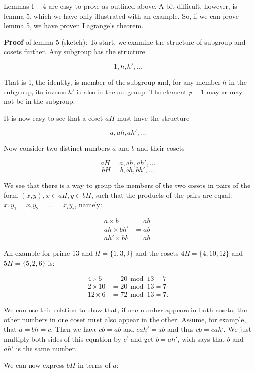 \documentclass{scrreprt}
\begin{document}
{Lemmas 1 -- 4 are easy to prove as outlined above.
A bit difficult, however, is lemma 5,
which we have only illustrated with an example.
So, if we can prove lemma 5,
we have proven Lagrange's theorem.

\textbf{Proof} of lemma 5 (sketch):
To start,
we examine the structure of subgroup
and cosets further.
Any subgroup has the structure

\[
1, h, h',\dots
\]

That is 1, the identity,
is member of the subgroup and,
for any member $h$ in the subgroup, 
its inverse $h'$ is also in the subgroup.
The element $p-1$ 
may or may not be in the subgroup.

It is now easy to see that
a coset $aH$ must have the structure

\[
a, ah, ah', \dots
\]

Now consider two distinct numbers $a$ and $b$
and their cosets

\[
aH = a, ah, ah', \dots
\]
\[
bH = b, bh, bh', \dots
\]

We see that there is a way to group
the members of the two cosets in pairs
of the form $(x,y), x \in aH, y \in bH$,
such that the products of the pairs are equal:
$x_1y_1 = x_2y_2 = \dots = x_iy_i$, namely:

\begin{align*}
a   \times b   & = ab\\
ah  \times bh' & = ab\\
ah' \times bh  & = ab.
\end{align*}

An example for prime 13 and $H = \lbrace 1,3,9\rbrace$
and the cosets $4H = \lbrace 4,10,12\rbrace$ and
$5H = \lbrace 5,2,6\rbrace$ is:

\begin{align*}
4   \times 5   & = 20 \bmod{13} = 7\\
2   \times 10  & = 20 \bmod{13} = 7\\
12  \times 6   & = 72 \bmod{13} = 7.
\end{align*}

We can use this relation to show that,
if one number appears in both cosets,
the other numbers in one coset
must also appear in the other.
Assume, for example, that $a = bh = c$.
Then we have $cb = ab$ and $cah' = ab$ and thus
$cb = cah'$.
We just multiply both sides of this equation
by $c'$ and get $b = ah'$,
wich says that 
$b$ and $ah'$ is the same number.

We can now express $bH$ in terms of $a$:

}
\end{document}
